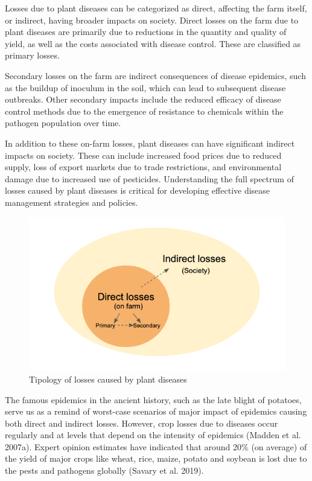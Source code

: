 \documentclass[
  letterpaper,
]{book}
\begin{document}
Losses due to plant diseases can be categorized as direct, affecting the
farm itself, or indirect, having broader impacts on society. Direct
losses on the farm due to plant diseases are primarily due to reductions
in the quantity and quality of yield, as well as the costs associated
with disease control. These are classified as primary losses.

Secondary losses on the farm are indirect consequences of disease
epidemics, such as the buildup of inoculum in the soil, which can lead
to subsequent disease outbreaks. Other secondary impacts include the
reduced efficacy of disease control methods due to the emergence of
resistance to chemicals within the pathogen population over time.

In addition to these on-farm losses, plant diseases can have significant
indirect impacts on society. These can include increased food prices due
to reduced supply, loss of export markets due to trade restrictions, and
environmental damage due to increased use of pesticides. Understanding
the full spectrum of losses caused by plant diseases is critical for
developing effective disease management strategies and policies.

\begin{figure}

{\centering \includegraphics[width=5.96875in,height=\textheight]{imgs/loss_diagram.png}

}

\caption{\label{fig-losses}Tipology of losses caused by plant diseases}

\end{figure}

The famous epidemics in the ancient history, such as the late blight of
potatoes, serve us as a remind of worst-case scenarios of major impact
of epidemics causing both direct and indirect losses. However, crop
losses due to diseases occur regularly and at levels that depend on the
intensity of epidemics (Madden et al. 2007a). Expert opinion estimates
have indicated that around 20\% (on average) of the yield of major crops
like wheat, rice, maize, potato and soybean is lost due to the pests and
pathogens globally (Savary et al. 2019).
\end{document}
